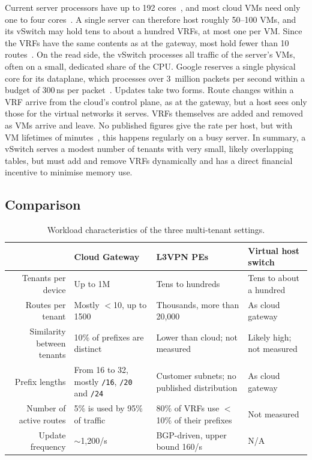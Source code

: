 \documentclass[11pt,a4paper,oneside]{report}
\newcommand{\pfx}[1]{\texttt{#1}}
\begin{document}
Current server processors have up to 192 cores~\cite{amd9965}, and most cloud
VMs need only one to four cores~\cite{hadary2020protean}. A single server can
therefore host roughly 50--100 VMs, and its vSwitch may hold tens to about a
hundred VRFs, at most one per VM. Since the VRFs have the same contents as at
the gateway, most hold fewer than 10 routes~\cite{lu2024quarktable}. On the read
side, the vSwitch processes all traffic of the server's VMs, often on a small,
dedicated share of the CPU. Google reserves a single physical core for its
dataplane, which processes over 3~million packets per second within a budget of
300\,ns per packet~\cite{dalton2018andromeda}. Updates take two forms. Route
changes within a VRF arrive from the cloud's control plane, as at the gateway,
but a host sees only those for the virtual networks it serves. VRFs themselves
are added and removed as VMs arrive and leave. No published figures give the
rate per host, but with VM lifetimes of minutes~\cite{hadary2020protean}, this
happens regularly on a busy server. In summary, a vSwitch serves a modest number
of tenants with very small, likely overlapping tables, but must add and remove
VRFs dynamically and has a direct financial incentive to minimise memory use.

\subsection{Comparison}
\label{sec:comparison}

\begin{table}[htbp]
  \centering
  \small
  \caption{Workload characteristics of the three multi-tenant settings.}
  \label{tab:settings}
  \begin{tabularx}{\textwidth}{@{} R L L L @{}}
    \toprule
      & \textbf{Cloud Gateway}
      & \textbf{L3VPN PEs}
      & \textbf{Virtual host switch} \\
    \midrule
    Tenants per device
      & Up to 1M
      & Tens to hundreds
      & Tens to about a hundred \\
    Routes per tenant
      & Mostly $<$10, up to 1500
      & Thousands, more than 20,000
      & As cloud gateway \\
    Similarity between tenants
      & 10\% of prefixes are distinct
      & Lower than cloud; not measured
      & Likely high; not measured \\
    Prefix lengths
      & From 16 to 32, mostly \pfx{/16}, \pfx{/20} and \pfx{/24}
      & Customer subnets; no published distribution
      & As cloud gateway \\
    Number of active routes
      & 5\% is used by 95\% of traffic
      & 80\% of VRFs use $<$10\% of their prefixes
      & Not measured \\
    Update frequency
      & $\sim$1,200/s
      & BGP-driven, upper bound 160/s
      & N/A \\
    \bottomrule
  \end{tabularx}
\end{table}
\end{document}
